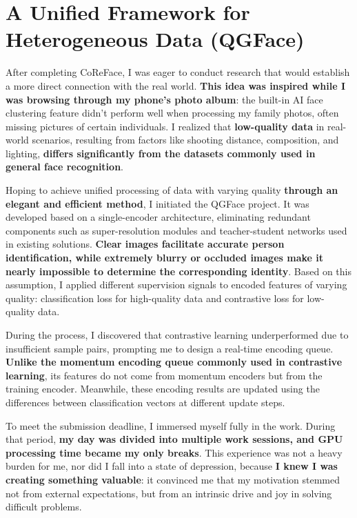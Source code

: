 \documentclass[11pt, letterpaper]{article}
\let\oldtextbf\textbf
\renewcommand{\textbf}[1]{{\color{black}\oldtextbf{#1}}}
\begin{document}
\section{A Unified Framework for Heterogeneous Data (QGFace) \cite{qgface}}

After completing CoReFace, I was eager to conduct research that would establish a more direct connection with the real world. \textbf{This idea was inspired while I was browsing through my phone's photo album}: the built-in AI face clustering feature didn't perform well when processing my family photos, often missing pictures of certain individuals. I realized that \textbf{low-quality data} in real-world scenarios, resulting from factors like shooting distance, composition, and lighting, \textbf{differs significantly from the datasets commonly used in general face recognition}.

Hoping to achieve unified processing of data with varying quality \textbf{through an elegant and efficient method}, I initiated the QGFace project.
It was developed based on a single-encoder architecture, eliminating redundant components such as super-resolution modules and teacher-student networks used in existing solutions. \textbf{Clear images facilitate accurate person identification, while extremely blurry or occluded images make it nearly impossible to determine the corresponding identity}. Based on this assumption, I applied different supervision signals to encoded features of varying quality: classification loss for high-quality data and contrastive loss for low-quality data.

During the process, I discovered that contrastive learning underperformed due to insufficient sample pairs, prompting me to design a real-time encoding queue. \textbf{Unlike the momentum encoding queue commonly used in contrastive learning}\cite{moco}, its features do not come from momentum encoders but from the training encoder. Meanwhile, these encoding results are updated using the differences between classification vectors at different update steps.

To meet the submission deadline, I immersed myself fully in the work. During that period, \textbf{my day was divided into multiple work sessions, and GPU processing time became my only breaks}. This experience was not a heavy burden for me, nor did I fall into a state of depression, because \textbf{I knew I was creating something valuable}: it convinced me that my motivation stemmed not from external expectations, but from an intrinsic drive and joy in solving difficult problems.
\end{document}
